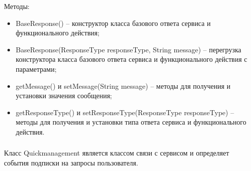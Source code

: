 Методы:
\begin{itemize}
  \item BaseResponse() – конструктор класса базового ответа сервиса и функционального действия;
  \item BaseResponse(ResponseType responseType, String message) – перегрузка конструктора класса базового ответа сервиса и функционального действия с параметрами;
  \item getMessage() и setMessage(String message) – методы для получения и установки значения сообщения;
  \item getResponseType() и setResponseType(ResponseType responseType) – методы для получения и установки типа ответа сервиса и функционального действия.
\end{itemize}

\subsubsection{}
\label{sub:arch_and_mod:application_server_layer:quickmanagement}

Класс Quickmanagement является классом связи с сервисом и определяет события подписки на запросы пользователя.

